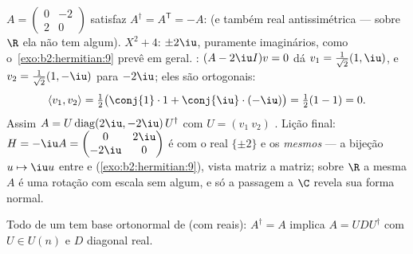 \begin{example}\label{ex:b2:hermitian:skewexample}
$A = \begin{pmatrix} 0 & -2\\ 2 & 0\end{pmatrix}$ satisfaz
$A^\dagger = A^{\mathsf T} = -A$:  (e também real
antissimétrica --- sobre $\R$ ela não tem  algum).
 $X^2 + 4$:  $\pm2\iu$,
puramente imaginários, como o~\cref{exo:b2:hermitian:9} prevê em
geral. : $(A - 2\iu I)v = 0$ dá $v_1 =
\frac{1}{\sqrt2}(1, \iu)$, e $v_2 = \frac{1}{\sqrt2}(1,
-\iu)$ para $-2\iu$; eles são ortogonais:
\[
\langle v_1, v_2\rangle
= \tfrac12\bigl(\conj{1}\cdot1 +
\conj{\iu}\cdot(-\iu)\bigr)
= \tfrac12(1 - 1) = 0 .
\]
Assim $A = U\operatorname{diag}(2\iu, -2\iu)\,U^\dagger$ com $U =
(v_1\ v_2)$ . Lição final: $H = -\iu A =
\begin{pmatrix} 0 & 2\iu\\ -2\iu & 0\end{pmatrix}$ é 
com o  real $\{\pm2\}$ e os \emph{mesmos}
 --- a bijeção $u \mapsto \iu u$ entre
 e 
(\cref{exo:b2:hermitian:9}), vista matriz a matriz; sobre $\R$
a mesma $A$ é uma rotação com escala sem  algum,
e só a passagem a $\C$ revela sua forma normal.
\end{example}

\begin{theorem}\label{thm:b2:hermitian:spectral}
Todo  de um  tem base
ortonormal de  (com  reais): $A^\dagger = A$
implica $A = U D U^{\dagger}$ com $U \in U(n)$ e $D$ diagonal
real.
\end{theorem}


